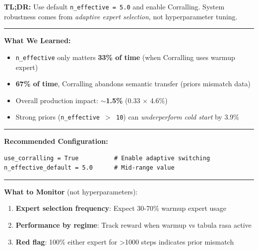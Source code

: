 
\begin{tcolorbox}[
    enhanced,
    attach boxed title to top left={xshift=5mm,yshift=-2mm},
    colback=blue!5!white,
    colframe=blue!75!black,
    colbacktitle=blue!75!black,
    title=\textbf{Production Guidance: Semantic Transfer Deployment},
    fonttitle=\bfseries,
    boxed title style={size=small,colframe=blue!75!black}
]

\textbf{TL;DR:} Use default \texttt{n\_effective = 5.0} and enable Corralling. System robustness comes from \textit{adaptive expert selection}, not hyperparameter tuning.

\vspace{0.2cm}
\hrule
\vspace{0.2cm}

\textbf{What We Learned:}
\begin{itemize}[leftmargin=*, itemsep=1pt, topsep=2pt]
    \item \texttt{n\_effective} only matters \textbf{33\% of time} (when Corralling uses warmup expert)
    \item \textbf{67\% of time}, Corralling abandons semantic transfer (priors mismatch data)
    \item Overall production impact: $\sim$\textbf{1.5\%} (0.33 $\times$ 4.6\%)
    \item Strong priors (\texttt{n\_effective $>$ 10}) can \textit{underperform cold start} by 3.9\%
\end{itemize}

\vspace{0.2cm}
\hrule
\vspace{0.2cm}

\textbf{Recommended Configuration:}
\begin{verbatim}
use_corralling = True          # Enable adaptive switching
n_effective_default = 5.0      # Mid-range value
\end{verbatim}

\vspace{0.2cm}
\hrule
\vspace{0.2cm}

\textbf{What to Monitor} (not hyperparameters):
\begin{enumerate}[leftmargin=*, itemsep=1pt, topsep=2pt]
    \item \textbf{Expert selection frequency}: Expect 30-70\% warmup expert usage
    \item \textbf{Performance by regime}: Track reward when warmup vs tabula rasa active
    \item \textbf{Red flag}: 100\% either expert for >1000 steps indicates prior mismatch
\end{enumerate}


\end{tcolorbox}
